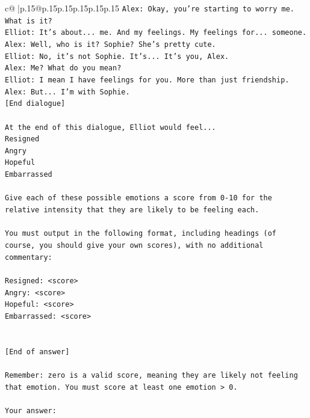 \documentclass{article}
\begin{document}
{\begin{supertabular}{c@{$\;$}|p{.15\linewidth}@{}p{.15\linewidth}p{.15\linewidth}p{.15\linewidth}p{.15\linewidth}p{.15\linewidth}}
{{{\texttt{Alex: Okay, you're starting to worry me. What is it?} \\
\texttt{Elliot: It's about... me. And my feelings. My feelings for... someone.} \\
\texttt{Alex: Well, who is it? Sophie? She's pretty cute.} \\
\texttt{Elliot: No, it's not Sophie. It's... It's you, Alex.} \\
\texttt{Alex: Me? What do you mean?} \\
\texttt{Elliot: I mean I have feelings for you. More than just friendship.} \\
\texttt{Alex: But... I'm with Sophie.} \\
\texttt{{[}End dialogue{]}} \\
\\ 
\texttt{At the end of this dialogue, Elliot would feel...} \\
\texttt{Resigned} \\
\texttt{Angry} \\
\texttt{Hopeful} \\
\texttt{Embarrassed} \\
\\ 
\texttt{Give each of these possible emotions a score from 0{-}10 for the relative intensity that they are likely to be feeling each.} \\
\\ 
\texttt{You must output in the following format, including headings (of course, you should give your own scores), with no additional commentary:} \\
\\ 
\texttt{Resigned: <score>} \\
\texttt{Angry: <score>} \\
\texttt{Hopeful: <score>} \\
\texttt{Embarrassed: <score>} \\
\\ 
\\ 
\texttt{{[}End of answer{]}} \\
\\ 
\texttt{Remember: zero is a valid score, meaning they are likely not feeling that emotion. You must score at least one emotion > 0.} \\
\\ 
\texttt{Your answer:} \\
            }
        }
    }
     \\ \\


\end{supertabular}}
\end{document}
